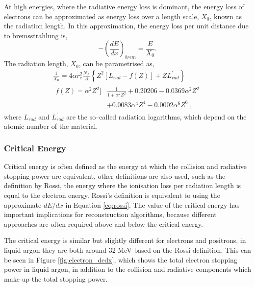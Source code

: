 At high energies, where the radiative energy loss is dominant, the energy loss
of electrons can be approximated as energy loss over a length scale, $X_0$,
known as the radiation length. In this approximation, the energy loss per 
unit distance due to bremsstrahlung is, 
\begin{equation}
	- \left( \frac{dE}{dx} \right)_{brem} = \frac{E}{X_0}.
	\label{eq:rossi}
\end{equation}
The radiation length, $X_0$, can be parametrised as,
\begin{equation}
	\begin{gathered}
		\frac{1}{X_0} = 4 \alpha r_e^2 \frac{N_A}{A} \left\{ Z^2 \left[L_{rad} - f(Z)\right] + Z
		L^\prime_{rad} \right\} \\
		\begin{aligned}
			f(Z) = \alpha^2 Z^2 \bigg[ &\frac{1}{1 + \alpha^2 Z^2} + 0.20206 - 0.0369
			\alpha^2 Z^2 \\ &+ 0.0083 \alpha^4 Z^4 -0.0002 \alpha^6 Z^6 \bigg],
		\end{aligned}
	\end{gathered}
	\label{eq:rad_length}
\end{equation}
where $L_{rad}$ and $L_{rad}^\prime$ are the so--called radiation logarithms,
which depend on the atomic number of the material\cite{Tsai:1973py}.

\subsubsection*{Critical Energy}
Critical energy is often defined as the energy at which the collision and 
radiative stopping power are equivalent, other definitions are also used, such
as the definition by Rossi, the energy where the ionisation loss per
radiation length is equal to the electron energy\cite{Rossi:1952kt}. Rossi's 
definition is equivalent to using the approximate $dE/dx$ in Equation 
\ref{eq:rossi}\cite{PhysRevD.98.030001}. The value of the critical energy has 
important implications for reconstruction algorithms, because different 
approaches are often required above and below the critical energy. 

The critical energy is similar but slightly different for electrons and 
positrons, in liquid argon they are both around 32 MeV based on the Rossi 
definition\cite{pdg_atomictables}. This can be seen in Figure 
\ref{fig:electron_dedx}, which shows the total electron stopping power in 
liquid argon, in addition to the collision and radiative components which make 
up the total stopping power. 

